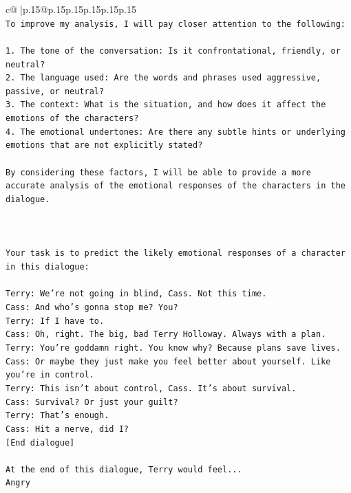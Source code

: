 \documentclass{article}
\begin{document}
{\begin{supertabular}{c@{$\;$}|p{.15\linewidth}@{}p{.15\linewidth}p{.15\linewidth}p{.15\linewidth}p{.15\linewidth}p{.15\linewidth}}
{{{\\ 
\texttt{To improve my analysis, I will pay closer attention to the following:} \\
\\ 
\texttt{1. The tone of the conversation: Is it confrontational, friendly, or neutral?} \\
\texttt{2. The language used: Are the words and phrases used aggressive, passive, or neutral?} \\
\texttt{3. The context: What is the situation, and how does it affect the emotions of the characters?} \\
\texttt{4. The emotional undertones: Are there any subtle hints or underlying emotions that are not explicitly stated?} \\
\\ 
\texttt{By considering these factors, I will be able to provide a more accurate analysis of the emotional responses of the characters in the dialogue.} \\
\\ 
\\ 
\\ 
\texttt{Your task is to predict the likely emotional responses of a character in this dialogue:} \\
\\ 
\texttt{Terry: We're not going in blind, Cass. Not this time.} \\
\texttt{Cass: And who's gonna stop me? You?} \\
\texttt{Terry: If I have to. } \\
\texttt{Cass: Oh, right. The big, bad Terry Holloway. Always with a plan. } \\
\texttt{Terry: You're goddamn right. You know why? Because plans save lives.} \\
\texttt{Cass: Or maybe they just make you feel better about yourself. Like you're in control.} \\
\texttt{Terry: This isn't about control, Cass. It's about survival. } \\
\texttt{Cass: Survival? Or just your guilt?} \\
\texttt{Terry: That's enough.} \\
\texttt{Cass: Hit a nerve, did I? } \\
\texttt{{[}End dialogue{]}} \\
\\ 
\texttt{At the end of this dialogue, Terry would feel...} \\
\texttt{Angry} \\
}}}
\end{supertabular}}
\end{document}
